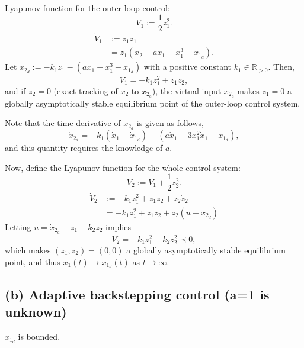 \documentclass{article}
\begin{document}
Lyapunov function for the outer-loop control:
\begin{equation}
  V_{1} := \frac{1}{2} z_{1}^{2}.
\end{equation}
\begin{align}
  \dot{V}_{1} &:= z_{1} \dot{z}_{1}
  \\
              &= z_{1} (x_{2} + a x_{1} - x_{1}^{3} - \dot{x}_{1_{d}}).
\end{align}
Let $x_{2_{d}} := -k_{1} z_{1} -(a x_{1}-x_{1}^{3} - \dot{x}_{1_{d}})$ with a positive constant $k_{1} \in \mathbb{R}_{>0}$.
Then,
\begin{equation}
  \dot{V}_{1} = -k_{1} z_{1}^{2} + z_{1} z_{2},
\end{equation}
and if $z_{2} = 0$ (exact tracking of $x_{2}$ to $x_{2_{d}}$), the virtual input $x_{2_{d}}$ makes $z_{1} = 0$ a globally asymptotically stable equilibrium point of the outer-loop control system.

Note that the time derivative of $x_{2_{d}}$ is given as follows,
\begin{equation}
  \dot{x}_{2_{d}} = -k_{1} (\dot{x}_{1} - \dot{x}_{1_{d}}) - (a \dot{x}_{1} - 3x_{1}^{2} \dot{x}_{1} - \ddot{x}_{1_{d}}),
\end{equation}
and this quantity requires the knowledge of $a$.

Now, define the Lyapunov function for the whole control system:
\begin{equation}
  V_{2} := V_{1} + \frac{1}{2} z_{2}^{2}.
\end{equation}
\begin{align}
  \dot{V}_{2} &:= -k_{1} z_{1}^{2} + z_{1} z_{2} + z_{2} \dot{z}_{2}
  \\
              &= -k_{1} z_{1}^{2} + z_{1} z_{2} + z_{2} (u - \dot{x}_{2_{d}})
\end{align}
Letting $u = \dot{x}_{2_{d}} - z_{1} - k_{2} z_{2}$ implies
\begin{equation}
  \dot{V}_{2} = -k_{1} z_{1}^{2} - k_{2} z_{2}^{2} \prec 0,
\end{equation}
which makes $(z_{1}, z_{2}) = (0, 0)$ a globally asymptotically stable equilibrium point,
and thus $x_{1}(t) \to x_{1_{d}} (t)$ as $t \to \infty$.

\subsection{(b) Adaptive backstepping control (a=1 is unknown)}
\begin{assumption}
  $x_{1_{d}}$ is bounded.
\end{assumption}
\end{document}
